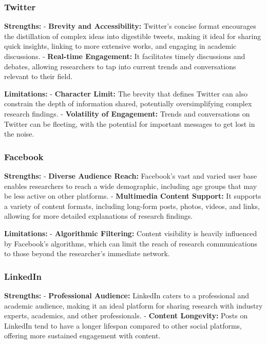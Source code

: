 \documentclass[
]{book}
\begin{document}
\hypertarget{twitter}{%
\subsubsection{Twitter}\label{twitter}}

\textbf{Strengths:}
- \textbf{Brevity and Accessibility:} Twitter's concise format encourages the distillation of complex ideas into digestible tweets, making it ideal for sharing quick insights, linking to more extensive works, and engaging in academic discussions.
- \textbf{Real-time Engagement:} It facilitates timely discussions and debates, allowing researchers to tap into current trends and conversations relevant to their field.

\textbf{Limitations:}
- \textbf{Character Limit:} The brevity that defines Twitter can also constrain the depth of information shared, potentially oversimplifying complex research findings.
- \textbf{Volatility of Engagement:} Trends and conversations on Twitter can be fleeting, with the potential for important messages to get lost in the noise.

\hypertarget{facebook}{%
\subsubsection{Facebook}\label{facebook}}

\textbf{Strengths:}
- \textbf{Diverse Audience Reach:} Facebook's vast and varied user base enables researchers to reach a wide demographic, including age groups that may be less active on other platforms.
- \textbf{Multimedia Content Support:} It supports a variety of content formats, including long-form posts, photos, videos, and links, allowing for more detailed explanations of research findings.

\textbf{Limitations:}
- \textbf{Algorithmic Filtering:} Content visibility is heavily influenced by Facebook's algorithms, which can limit the reach of research communications to those beyond the researcher's immediate network.

\hypertarget{linkedin}{%
\subsubsection{LinkedIn}\label{linkedin}}

\textbf{Strengths:}
- \textbf{Professional Audience:} LinkedIn caters to a professional and academic audience, making it an ideal platform for sharing research with industry experts, academics, and other professionals.
- \textbf{Content Longevity:} Posts on LinkedIn tend to have a longer lifespan compared to other social platforms, offering more sustained engagement with content.
\end{document}
